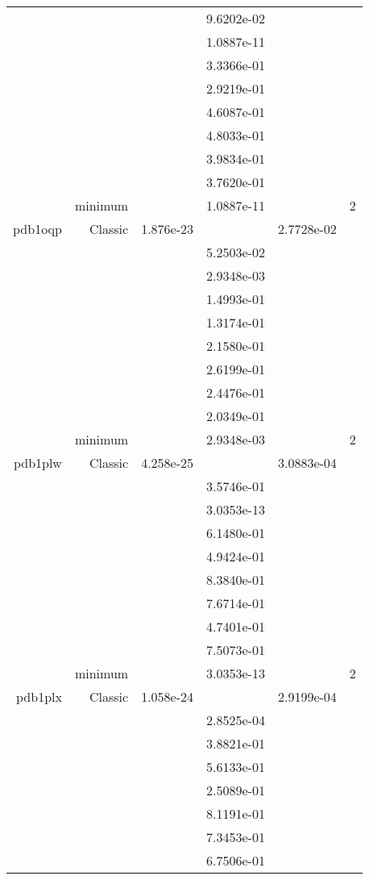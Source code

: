 \begin{xltabular}{\textwidth}{r|rS[table-format=1.3e+2]S[table-format=1.4e+2]S[table-format=1.4e+2]S[table-format=-1.5]}
&  &  & 9.6202e-02 & & \\
&  &  & 1.0887e-11 & & \\
&  &  & 3.3366e-01 & & \\
&  &  & 2.9219e-01 & & \\
&  &  & 4.6087e-01 & & \\
&  &  & 4.8033e-01 & & \\
&  &  & 3.9834e-01 & & \\
&  &  & 3.7620e-01 & & \\
& minimum &  & 1.0887e-11 & & 2 \\  \addlinespace
pdb1oqp & Classic & 1.876e-23 &  & 2.7728e-02 & \\
&  &  & 5.2503e-02 & & \\
&  &  & 2.9348e-03 & & \\
&  &  & 1.4993e-01 & & \\
&  &  & 1.3174e-01 & & \\
&  &  & 2.1580e-01 & & \\
&  &  & 2.6199e-01 & & \\
&  &  & 2.4476e-01 & & \\
&  &  & 2.0349e-01 & & \\
& minimum &  & 2.9348e-03 & & 2 \\  \addlinespace
pdb1plw & Classic & 4.258e-25 &  & 3.0883e-04 & \\
&  &  & 3.5746e-01 & & \\
&  &  & 3.0353e-13 & & \\
&  &  & 6.1480e-01 & & \\
&  &  & 4.9424e-01 & & \\
&  &  & 8.3840e-01 & & \\
&  &  & 7.6714e-01 & & \\
&  &  & 4.7401e-01 & & \\
&  &  & 7.5073e-01 & & \\
& minimum &  & 3.0353e-13 & & 2 \\  \addlinespace
pdb1plx & Classic & 1.058e-24 &  & 2.9199e-04 & \\
&  &  & 2.8525e-04 & & \\
&  &  & 3.8821e-01 & & \\
&  &  & 5.6133e-01 & & \\
&  &  & 2.5089e-01 & & \\
&  &  & 8.1191e-01 & & \\
&  &  & 7.3453e-01 & & \\
&  &  & 6.7506e-01 & & \\

\end{xltabular}
